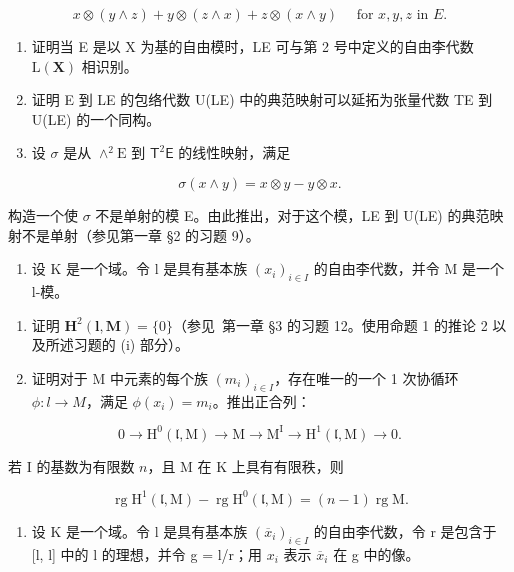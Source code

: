 \[
x \otimes (y \wedge z) + y \otimes (z \wedge x) + z \otimes (x \wedge y) \quad \text { for } x, y, z \text { in } E.
\]

\begin{enumerate}
\def\labelenumi{(\alph{enumi})}
\setcounter{enumi}{3}
\item
  证明当 E 是以 X 为基的自由模时，LE 可与第 2 号中定义的自由李代数 \(\mathrm{L}(\mathbf{X})\) 相识别。
\item
  证明 E 到 LE 的包络代数 U(LE) 中的典范映射可以延拓为张量代数 TE 到 U(LE) 的一个同构。
\item
  设 \(\sigma\) 是从 \(\wedge^2\mathrm{E}\) 到 \(\mathsf{T}^2\mathsf{E}\) 的线性映射，满足
\end{enumerate}

\[
\sigma (x \wedge y) = x \otimes y - y \otimes x.
\]

构造一个使 \(\sigma\) 不是单射的模 E。由此推出，对于这个模，LE 到 U(LE) 的典范映射不是单射（参见第一章 §2 的习题 9）。

\begin{enumerate}
\def\labelenumi{\arabic{enumi}.}
\setcounter{enumi}{6}
\tightlist
\item
  设 K 是一个域。令 l 是具有基本族 \((x_{i})_{i\in I}\) 的自由李代数，并令 M 是一个 l-模。
\end{enumerate}

\begin{enumerate}
\def\labelenumi{(\alph{enumi})}
\item
  证明 \(\mathbf{H}^2 (\mathbf{l},\mathbf{M}) = \{0\}\)（参见~第一章 §3 的习题 12。使用命题 1 的推论 2 以及所述习题的 (i) 部分）。
\item
  证明对于 M 中元素的每个族 \((m_{i})_{i\in I}\)，存在唯一的一个 1 次协循环 \(\phi:l\to M\)，满足 \(\phi (x_i) = m_i\)。推出正合列：
\end{enumerate}

\[
0 \rightarrow \mathrm{H} ^ {0} (\mathfrak {l}, \mathrm{M}) \rightarrow \mathrm{M} \rightarrow \mathrm{M} ^ {\mathrm{I}} \rightarrow \mathrm{H} ^ {1} (\mathfrak {l}, \mathrm{M}) \rightarrow 0.
\]

若 I 的基数为有限数 \(n\)，且 M 在 K 上具有有限秩，则

\[
\operatorname{rg} \mathrm{H} ^ {1} (\mathfrak {l}, \mathrm{M}) - \operatorname{rg} \mathrm{H} ^ {0} (\mathfrak {l}, \mathrm{M}) = (n - 1) \operatorname{rg} \mathrm{M}.
\]

\begin{enumerate}
\def\labelenumi{\arabic{enumi}.}
\setcounter{enumi}{7}
\tightlist
\item
  设 K 是一个域。令 l 是具有基本族 \((\overline{x}_{i})_{i\in I}\) 的自由李代数，令 r 是包含于 {[}l, l{]} 中的 l 的理想，并令 g = l/r；用 \(x_{i}\) 表示 \(\overline{x}_{i}\) 在 g 中的像。
\end{enumerate}

